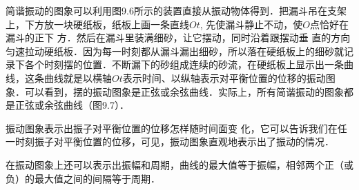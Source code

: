 简谐振动的图象可以利用图9.6所示的装置直接从振动物体得到．把漏斗吊在支架上，下方放一块硬纸板，纸板上画一条直线$Ot$, 先使漏斗静止不动，使$O$点恰好在漏斗的正下
方．然后在漏斗里装满细砂，让它摆动，同时沿着跟摆动垂
直的方向匀速拉动硬纸板．因为每一时刻都从漏斗漏出细砂，所以落在硬纸板上的细砂就记录下各个时刻摆的位置．不断漏下的砂组成连续的砂流，在硬纸板上显示出一条曲线，这条曲线就是以横轴$Ot$表示时间、以纵轴表示对平衡位置的位移的振动图象．可以看到，摆的振动图象是正弦或余弦曲线．实际上，所有简谐振动的图象都是正弦或余弦曲线（图9.7）．

振动图象表示出振子对平衡位置的位移怎样随时间面变
化，它可以告诉我们在任一时刻振子对平衡位置的位移，可见，振动图象直观地表示出了振动的情况．

在振动图象上还可以表示出振幅和周期，曲线的最大值等于振幅，相邻两个正（或负）的最大值之间的间隔等于周期．

